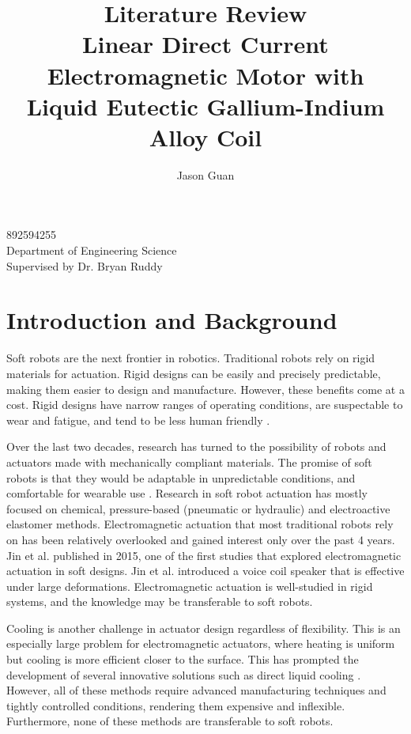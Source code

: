 \documentclass[a4paper,12pt]{article}
\title{Literature Review \\
	\large Linear Direct Current Electromagnetic Motor with\\
	Liquid Eutectic Gallium-Indium Alloy Coil}
\author{Jason Guan}
\begin{document}
\maketitle
\begin{center}
    892594255\\
    Department of Engineering Science\\
    Supervised by Dr. Bryan Ruddy
\end{center}

\newpage

\section{Introduction and Background}

Soft robots are the next frontier in robotics. Traditional robots rely on rigid materials for actuation. Rigid designs can be easily and precisely predictable, making them easier to design and manufacture. However, these benefits come at a cost. Rigid designs have narrow ranges of operating conditions, are suspectable to wear and fatigue, and tend to be less human friendly \cite{rusDesignFabricationControl2015}.

Over the last two decades, research has turned to the possibility of robots and actuators made with mechanically compliant materials. The promise of soft robots is that they would be adaptable in unpredictable conditions, and comfortable for wearable use \cite{leeSoftRobotReview2017}. Research in soft robot actuation has mostly focused on chemical\cite{onalSoftMobileRobots2017}, pressure-based (pneumatic or hydraulic)\cite{suzumoriBendingPneumaticRubber2007} and electroactive elastomer\cite{andersonMultifunctionalDielectricElastomer2012} methods. Electromagnetic actuation that most traditional robots rely on has been relatively overlooked and gained interest only over the past 4 years. Jin et al. published \cite{jinStretchableLoudspeakerUsing2015} in 2015, one of the first studies that explored electromagnetic actuation in soft designs. Jin et al. introduced a voice coil speaker that is effective under large deformations. Electromagnetic actuation is well-studied in rigid systems, and the knowledge may be transferable to soft robots.

Cooling is another challenge in actuator design regardless of flexibility. This is an especially large problem for electromagnetic actuators, where heating is uniform but cooling is more efficient closer to the surface. This has prompted the development of several innovative solutions such as direct liquid cooling \cite{henkeChallengesOpportunitiesVery2018}. However, all of these methods require advanced manufacturing techniques and tightly controlled conditions, rendering them expensive and inflexible. Furthermore, none of these methods are transferable to soft robots.
\end{document}
